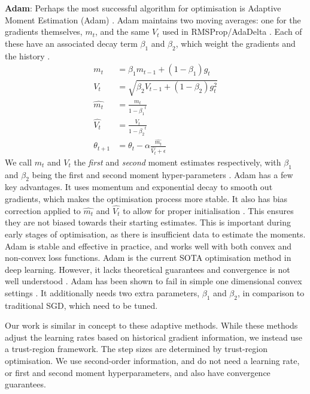 \textbf{Adam}: Perhaps the most successful algorithm for optimisation is Adaptive Moment Estimation (Adam) \citep{kingma2014adam}. Adam maintains two moving averages: one for the gradients themselves, $m_t$, and the same $V_t$ used in RMSProp/AdaDelta \citep{kingma2014adam}. Each of these have an associated decay term $\beta_1$ and $\beta_2$, which weight the gradients and the history \citep{kingma2014adam}.
\begin{align}
m_t &= \beta_1 m_{t-1} + (1 - \beta_1) g_t \label{eq:m_t} \\
V_t &= \sqrt{\beta_2 V_{t-1} + (1 - \beta_2) g_t^2} \\
\hat{m_t} &= \frac{m_t}{1 - {\beta_1}^t} \\
\hat{V_t} &= \frac{V_t}{1 - {\beta_2}^t} \\
\theta_{t+1} &= \theta_t - \alpha \frac{\hat{m_t}}{{\hat{V_t}} + \epsilon} \label{eq:adam_update}
\end{align}
We call $m_t$ and $V_t$ the \textit{first} and \textit{second} moment estimates respectively, with $\beta_1$ and $\beta_2$ being the first and second moment hyper-parameters \citep{kingma2014adam}. Adam has a few key advantages. It uses momentum and exponential decay to smooth out gradients, which makes the optimisation process more stable. It also has bias correction applied to $\hat{m_t}$ and $\hat{V_t}$ to allow for proper initialisation \citep{kingma2014adam}. This ensures they are not biased towards their starting estimates. This is important during early stages of optimisation, as there is insufficient data to estimate the moments. Adam is stable and effective in practice, and works well with both convex and non-convex loss functions. Adam is the current SOTA optimisation method in deep learning. However, it lacks theoretical guarantees and convergence is not well understood \citep{reddi2019asmgrad}. Adam has been shown to fail in simple one dimensional convex settings \citep{reddi2019asmgrad}. It additionally needs two extra parameters, $\beta_1$ and $\beta_2$, in comparison to traditional SGD, which need to be tuned.

Our work is similar in concept to these adaptive methods. While these methods adjust the learning rates based on historical gradient information, we instead use a trust-region framework. The step sizes are determined by trust-region optimisation. We use second-order information, and do not need a learning rate, or first and second moment hyperparameters, and also have convergence guarantees.

